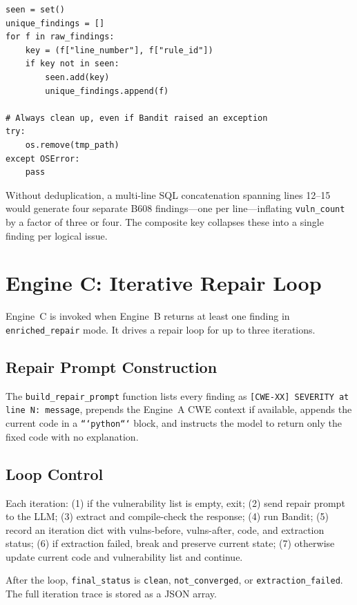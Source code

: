 \documentclass[12pt,a4paper]{report}
\begin{document}
\begin{lstlisting}[caption={Deduplication and cleanup in \texttt{engine\_b\_scan.py}},
                   label={lst:bdedup}]
seen = set()
unique_findings = []
for f in raw_findings:
    key = (f["line_number"], f["rule_id"])
    if key not in seen:
        seen.add(key)
        unique_findings.append(f)

# Always clean up, even if Bandit raised an exception
try:
    os.remove(tmp_path)
except OSError:
    pass
\end{lstlisting}

Without deduplication, a multi-line SQL concatenation spanning lines 12--15
would generate four separate B608 findings---one per line---inflating
\texttt{vuln\_count} by a factor of three or four. The composite key collapses
these into a single finding per logical issue.

\section{Engine C: Iterative Repair Loop}
\label{sec:enginec}

Engine~C is invoked when Engine~B returns at least one finding in
\texttt{enriched\_repair} mode. It drives a repair loop for up to three iterations.

\subsection{Repair Prompt Construction}

The \texttt{build\_repair\_prompt} function lists every finding as
\texttt{[CWE-XX] SEVERITY at line N: message}, prepends the Engine~A CWE context
if available, appends the current code in a \texttt{```python```} block, and
instructs the model to return only the fixed code with no explanation.

\subsection{Loop Control}

Each iteration: (1) if the vulnerability list is empty, exit; (2) send repair
prompt to the LLM; (3) extract and compile-check the response; (4) run Bandit;
(5) record an iteration dict with vulns-before, vulns-after, code, and extraction
status; (6) if extraction failed, break and preserve current state; (7) otherwise
update current code and vulnerability list and continue.

After the loop, \texttt{final\_status} is \texttt{clean}, \texttt{not\_converged},
or \texttt{extraction\_failed}. The full iteration trace is stored as a JSON array.
\end{document}
